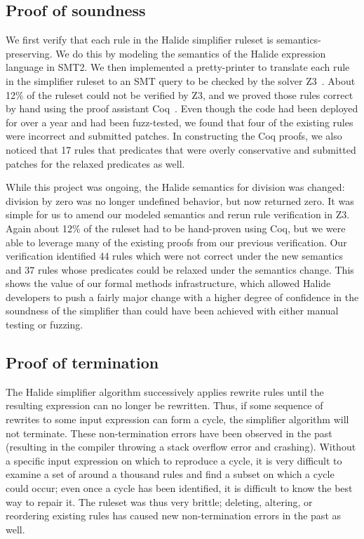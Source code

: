 \subsection{Proof of soundness}
We first verify that each rule in the Halide simplifier ruleset is semantics-preserving. We do this by modeling the semantics of the Halide expression language in SMT2. We then implemented a pretty-printer to translate each rule in the simplifier ruleset to an SMT query to be checked by the solver Z3~\cite{de2008z3}. About 12\% of the ruleset could not be verified by Z3, and we proved those rules correct by hand using the proof assistant Coq~\cite{Coq19}. Even though the code had been deployed for over a year and had been fuzz-tested, we found that four of the existing rules were incorrect and submitted patches. In constructing the Coq proofs, we also noticed that 17 rules that predicates that were overly conservative and submitted patches for the relaxed predicates as well.

While this project was ongoing, the Halide semantics for division was changed: division by zero was no longer undefined behavior, but now returned zero. It was simple for us to amend our modeled semantics and rerun rule verification in Z3. Again about 12\% of the ruleset had to be hand-proven using Coq, but we were able to leverage many of the existing proofs from our previous verification. Our verification identified 44 rules which were not correct under the new semantics and 37 rules whose predicates could be relaxed under the semantics change. This shows the value of our formal methods infrastructure, which allowed Halide developers to push a fairly major change with a higher degree of confidence in the soundness of the simplifier than could have been achieved with either manual testing or fuzzing.

\subsection{Proof of termination}
The Halide simplifier algorithm successively applies rewrite rules until the resulting expression can no longer be rewritten. Thus, if some sequence of rewrites to some input expression can form a cycle, the simplifier algorithm will not terminate. These non-termination errors have been observed in the past (resulting in the compiler throwing a stack overflow error and crashing). Without a specific input expression on which to reproduce a cycle, it is very difficult to examine a set of around a thousand rules and find a subset on which a cycle could occur; even once a cycle has been identified, it is difficult to know the best way to repair it. The ruleset was thus very brittle; deleting, altering, or reordering existing rules has caused new non-termination errors in the past as well.

